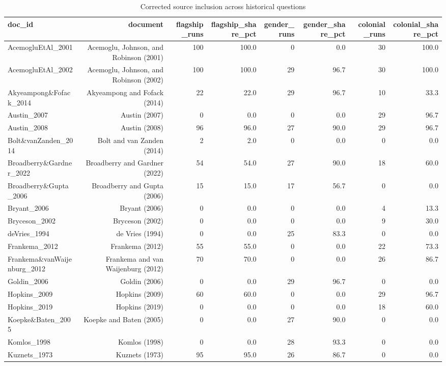 \begin{table}[ht]
\centering
\caption{Corrected source inclusion across historical questions}
\scriptsize
\begin{tabular}{lrrrrrrr}
\toprule
doc\_id & document & flagship\_runs & flagship\_share\_pct & gender\_runs & gender\_share\_pct & colonial\_runs & colonial\_share\_pct \\
\midrule
AcemogluEtAl\_2001 & Acemoglu, Johnson, and Robinson (2001) & 100 & 100.0 & 0 & 0.0 & 30 & 100.0 \\
AcemogluEtAl\_2002 & Acemoglu, Johnson, and Robinson (2002) & 100 & 100.0 & 29 & 96.7 & 30 & 100.0 \\
Akyeampong\&Fofack\_2014 & Akyeampong and Fofack (2014) & 22 & 22.0 & 29 & 96.7 & 10 & 33.3 \\
Austin\_2007 & Austin (2007) & 0 & 0.0 & 0 & 0.0 & 29 & 96.7 \\
Austin\_2008 & Austin (2008) & 96 & 96.0 & 27 & 90.0 & 29 & 96.7 \\
Bolt\&vanZanden\_2014 & Bolt and van Zanden (2014) & 2 & 2.0 & 0 & 0.0 & 0 & 0.0 \\
Broadberry\&Gardner\_2022 & Broadberry and Gardner (2022) & 54 & 54.0 & 27 & 90.0 & 18 & 60.0 \\
Broadberry\&Gupta\_2006 & Broadberry and Gupta (2006) & 15 & 15.0 & 17 & 56.7 & 0 & 0.0 \\
Bryant\_2006 & Bryant (2006) & 0 & 0.0 & 0 & 0.0 & 4 & 13.3 \\
Bryceson\_2002 & Bryceson (2002) & 0 & 0.0 & 0 & 0.0 & 9 & 30.0 \\
deVries\_1994 & de Vries (1994) & 0 & 0.0 & 25 & 83.3 & 0 & 0.0 \\
Frankema\_2012 & Frankema (2012) & 55 & 55.0 & 0 & 0.0 & 22 & 73.3 \\
Frankema\&vanWaijenburg\_2012 & Frankema and van Waijenburg (2012) & 70 & 70.0 & 0 & 0.0 & 26 & 86.7 \\
Goldin\_2006 & Goldin (2006) & 0 & 0.0 & 29 & 96.7 & 0 & 0.0 \\
Hopkins\_2009 & Hopkins (2009) & 60 & 60.0 & 0 & 0.0 & 29 & 96.7 \\
Hopkins\_2019 & Hopkins (2019) & 0 & 0.0 & 0 & 0.0 & 18 & 60.0 \\
Koepke\&Baten\_2005 & Koepke and Baten (2005) & 0 & 0.0 & 27 & 90.0 & 0 & 0.0 \\
Komlos\_1998 & Komlos (1998) & 0 & 0.0 & 28 & 93.3 & 0 & 0.0 \\
Kuznets\_1973 & Kuznets (1973) & 95 & 95.0 & 26 & 86.7 & 0 & 0.0 \\

\end{tabular}
\end{table}
